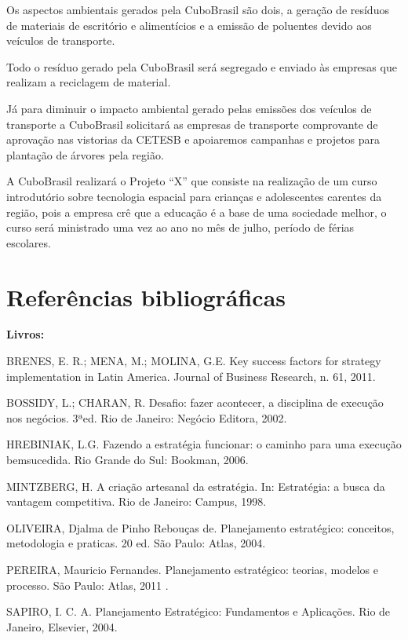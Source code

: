 \documentclass[
	12pt,				%
	openright,			%
	oneside,			%
	a4paper,			%
	english,			%
	french,				%
	spanish,			%
	brazil				%
	]{abntex2}
\begin{document}
	Os aspectos ambientais gerados pela CuboBrasil são dois, a geração de resíduos de materiais de escritório e alimentícios e a emissão de poluentes devido aos veículos de transporte.
	
	Todo o resíduo gerado pela CuboBrasil será segregado e enviado às empresas que realizam a reciclagem de material.
	
	Já para diminuir o impacto ambiental gerado pelas emissões dos veículos de transporte a CuboBrasil solicitará as empresas de transporte comprovante de aprovação nas vistorias da CETESB e apoiaremos campanhas e projetos para plantação de árvores pela região.
	
	A CuboBrasil realizará o Projeto “X” que consiste na realização de um curso introdutório sobre tecnologia espacial para crianças e adolescentes carentes da região, pois a empresa crê que a educação é a base de uma sociedade melhor, o curso será ministrado uma vez ao ano no mês de julho, período de férias escolares.


\chapter[Referências bibliográficas]{Referências bibliográficas}

\textbf{Livros:}
	
BRENES, E. R.; MENA, M.; MOLINA, G.E. Key success factors for strategy implementation in Latin America. Journal of Business Research, n. 61, 2011.

BOSSIDY, L.; CHARAN, R. Desafio: fazer acontecer, a disciplina de execução nos negócios. 3ªed. Rio de Janeiro: Negócio Editora, 2002.

HREBINIAK, L.G. Fazendo a estratégia funcionar: o caminho para uma execução bemsucedida. Rio Grande do Sul: Bookman, 2006.

MINTZBERG, H. A criação artesanal da estratégia. In:  Estratégia: a busca da vantagem competitiva. Rio de Janeiro: Campus, 1998. 

OLIVEIRA, Djalma de Pinho Rebouças de. Planejamento estratégico: conceitos, metodologia e praticas. 20 ed. São Paulo: Atlas, 2004.

PEREIRA, Mauricio Fernandes. Planejamento estratégico: teorias, modelos e processo. São Paulo: Atlas, 2011	.
 
SAPIRO, I. C. A. Planejamento Estratégico: Fundamentos e Aplicações. Rio de Janeiro, Elsevier, 2004.
\end{document}
